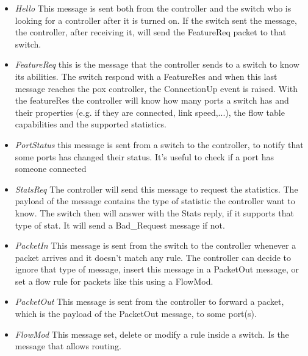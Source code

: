 \documentclass[conference,10pt]{IEEEtran}
\begin{document}
\begin{itemize}

\item \emph{Hello} \newline This message is sent both from the controller and the switch who is looking for a controller after it
	is turned on. If the switch sent the message, the controller, after receiving it, will send the FeatureReq packet to that switch.
\item \emph{FeatureReq} \newline this is the message that the controller sends to a switch to know its abilities. The switch
	respond with a FeatureRes and when this last message reaches the pox controller, the ConnectionUp event is raised.
	With the featureRes the controller will know how many ports a switch has and their properties (e.g. if they are connected, link speed,...), the flow table capabilities and the supported statistics.
\item \emph{PortStatus} \newline this message is sent from a switch to the controller, to notify that some ports has changed their status.
		It's useful to check if a port has someone connected
\item \emph{StatsReq} \newline The controller will send this message to request the statistics. The payload of the message contains the type of statistic the controller want to know.
		The switch then will answer with the Stats reply, if it supports that type of stat. It will send a Bad_Request message if not.
\item \emph{PacketIn} \newline This message is sent from the switch to the controller whenever a packet arrives and it doesn't match
		any rule. The controller can decide to ignore that type of message, insert this message in a PacketOut message, or set
		a flow rule for packets like this using a FlowMod.
\item \emph{PacketOut} \newline This message is sent from the controller to forward a packet, which is the payload of the PacketOut message, to some
		port(s).
\item \emph{FlowMod} \newline This message set, delete or modify a rule inside a switch. Is the message that allows routing.
\\
\\
\end{itemize}
\end{document}
